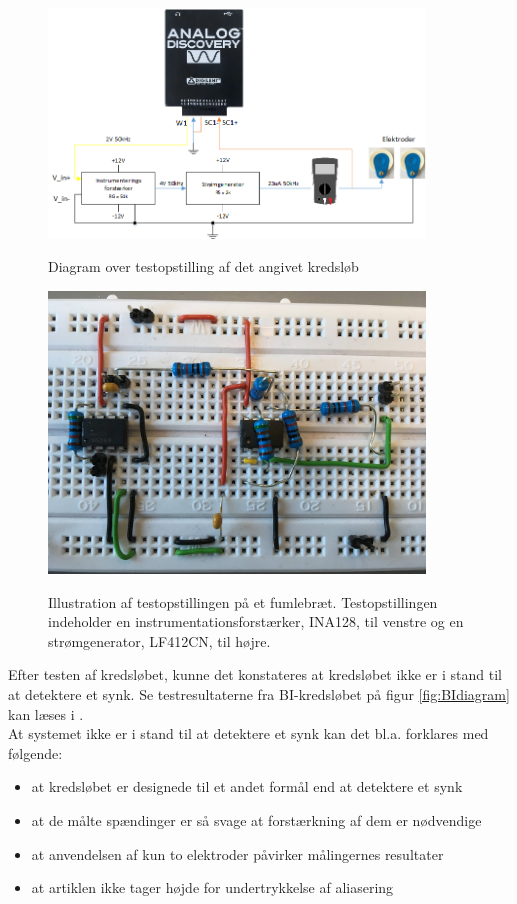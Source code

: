 \begin{figure}[H]
\centering
{\includegraphics[width=10cm]
{Figure/testopstilling11}}
\caption{Diagram over testopstilling af det angivet kredsløb}
\label{fig:testopstilling1}
\end{figure} 



\begin{figure}[H]
\centering
{\includegraphics[width=10cm]
{Figure/oprindeligekredslob2}}
\caption{Illustration af testopstillingen på et fumlebræt. Testopstillingen indeholder en instrumentationsforstærker, INA128, til venstre og en strømgenerator, LF412CN, til højre.}
\label{fig:celler}
\end{figure}

Efter testen af kredsløbet, kunne det konstateres at kredsløbet ikke er i stand til at detektere et synk. Se testresultaterne fra BI-kredsløbet på figur \ref{fig:BIdiagram} kan læses i   .\\

\pagebreak
At systemet ikke er i stand til at detektere et synk kan det bl.a. forklares med følgende:


 
\begin{itemize}
\item at kredsløbet er designede til et andet formål end at detektere et synk
\item at de målte spændinger er så svage at forstærkning af dem er nødvendige
\item at anvendelsen af kun to elektroder påvirker målingernes resultater
\item at artiklen ikke tager højde for undertrykkelse af aliasering
\end{itemize}

